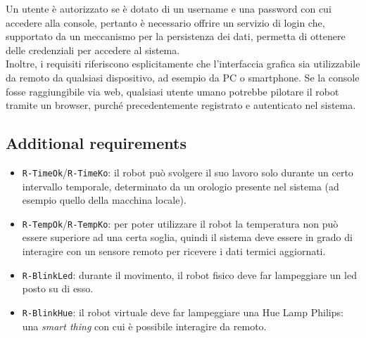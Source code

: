 \documentclass{../llncs}
\newcommand{\code}[1]{{\color{blue}\small{\texttt{#1}}}}
\begin{document}
Un utente è autorizzato se è dotato di un username e una password con cui accedere alla console, pertanto è necessario offrire un servizio di login che, supportato da un meccanismo per la persistenza dei dati, permetta di ottenere delle credenziali per accedere al sistema.\\

%
%

Inoltre, i requisiti riferiscono esplicitamente che l'interfaccia grafica sia utilizzabile da remoto da qualsiasi dispositivo, ad esempio da PC o smartphone. Se la console fosse raggiungibile via web, qualsiasi utente umano potrebbe pilotare il robot tramite un browser, purché precedentemente registrato e autenticato nel sistema.


\subsection{Additional requirements}

\begin{itemize}
\item \code{R-TimeOk}/\code{R-TimeKo}: il robot può svolgere il suo lavoro solo durante un certo intervallo temporale, determinato da un orologio presente nel sistema (ad esempio quello della macchina locale).
\item \code{R-TempOk}/\code{R-TempKo}: per poter utilizzare il robot la temperatura non può essere superiore ad una certa soglia, quindi il sistema deve essere in grado di interagire con un sensore remoto per ricevere i dati termici aggiornati. 
\item \code{R-BlinkLed}: durante il movimento, il robot fisico deve far lampeggiare un led posto su di esso.
\item \code{R-BlinkHue}: il robot virtuale deve far lampeggiare una Hue Lamp Philips: una \emph{smart thing} con cui è possibile interagire da remoto.
\end{itemize}
\end{document}
